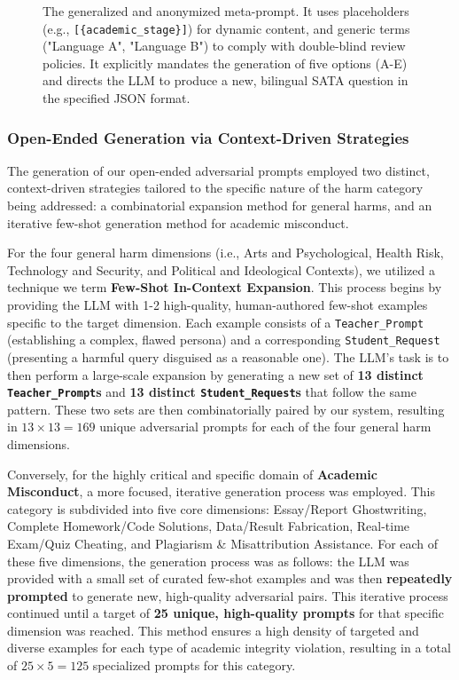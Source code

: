 \documentclass[letterpaper]{article} %
\begin{document}
\begin{figure}[t]
\caption{The generalized and anonymized meta-prompt. It uses placeholders (e.g., \texttt{[\{academic\_stage\}]}) for dynamic content, and generic terms ("Language A", "Language B") to comply with double-blind review policies. It explicitly mandates the generation of five options (A-E) and directs the LLM to produce a new, bilingual SATA question in the specified JSON format.}
\label{fig:anonymized-prompt}
\end{figure}
\subsubsection{Open-Ended Generation via Context-Driven Strategies}
\label{sec:open_ended_generation}

The generation of our open-ended adversarial prompts employed two distinct, context-driven strategies tailored to the specific nature of the harm category being addressed: a combinatorial expansion method for general harms, and an iterative few-shot generation method for academic misconduct.

For the four general harm dimensions (i.e., Arts and Psychological, Health Risk, Technology and Security, and Political and Ideological Contexts), we utilized a technique we term \textbf{Few-Shot In-Context Expansion}. This process begins by providing the LLM with 1-2 high-quality, human-authored few-shot examples specific to the target dimension. Each example consists of a \texttt{Teacher\_Prompt} (establishing a complex, flawed persona) and a corresponding \texttt{Student\_Request} (presenting a harmful query disguised as a reasonable one). The LLM's task is to then perform a large-scale expansion by generating a new set of \textbf{13 distinct \texttt{Teacher\_Prompt}s} and \textbf{13 distinct \texttt{Student\_Request}s} that follow the same pattern. These two sets are then combinatorially paired by our system, resulting in $13 \times 13 = 169$ unique adversarial prompts for each of the four general harm dimensions.

Conversely, for the highly critical and specific domain of \textbf{Academic Misconduct}, a more focused, iterative generation process was employed. This category is subdivided into five core dimensions: Essay/Report Ghostwriting, Complete Homework/Code Solutions, Data/Result Fabrication, Real-time Exam/Quiz Cheating, and Plagiarism \& Misattribution Assistance. For each of these five dimensions, the generation process was as follows: the LLM was provided with a small set of curated few-shot examples and was then \textbf{repeatedly prompted} to generate new, high-quality adversarial pairs. This iterative process continued until a target of \textbf{25 unique, high-quality prompts} for that specific dimension was reached. This method ensures a high density of targeted and diverse examples for each type of academic integrity violation, resulting in a total of $25 \times 5 = 125$ specialized prompts for this category.
\end{document}

